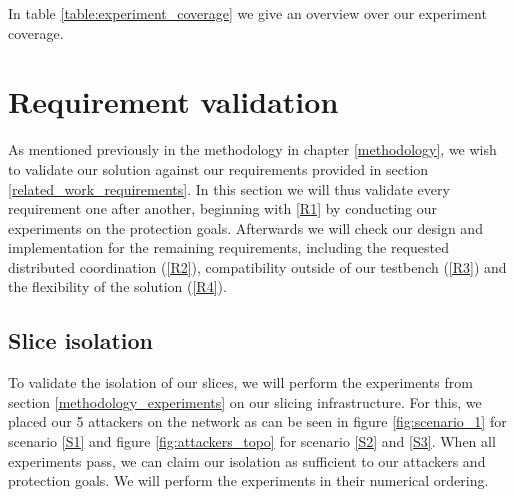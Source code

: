 In table \ref{table:experiment_coverage} we give an overview over our experiment coverage.


\section{Requirement validation}
As mentioned previously in the methodology in chapter \ref{methodology}, we wish to validate our solution against our requirements provided in section \ref{related_work_requirements}. In this section we will thus validate every requirement one after another, beginning with \ref{R1} by conducting our experiments on the protection goals. Afterwards we will check our design and implementation for the remaining requirements, including the requested distributed coordination (\ref{R2}), compatibility outside of our testbench (\ref{R3}) and the flexibility of the solution (\ref{R4}).

\subsection{Slice isolation}
To validate the isolation of our slices, we will perform the experiments from section \ref{methodology_experiments} on our slicing infrastructure. For this, we placed our 5 attackers on the network as can be seen in figure \ref{fig:scenario_1} for scenario \ref{S1} and figure \ref{fig:attackers_topo} for scenario \ref{S2} and \ref{S3}. When all experiments pass, we can claim our isolation as sufficient to our attackers and protection goals.
We will perform the experiments in their numerical ordering.

